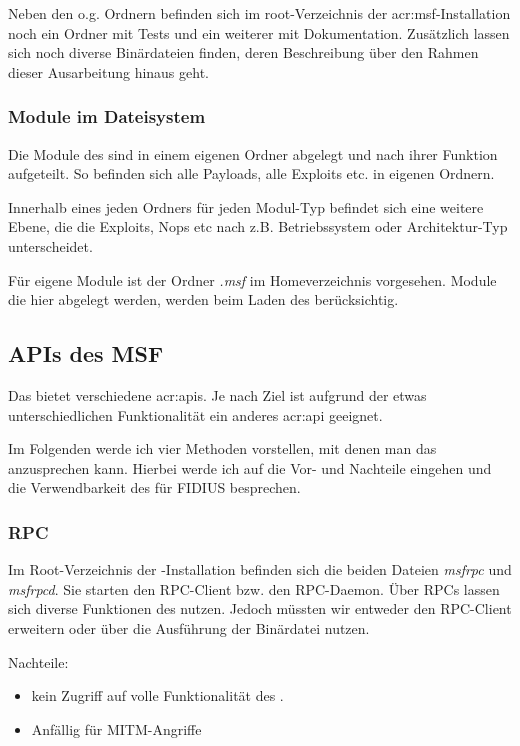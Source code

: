 Neben den o.g. Ordnern befinden sich im root-Verzeichnis der
\gls{acr:msf}-Installation noch ein Ordner mit Tests und ein weiterer
mit Dokumentation. Zusätzlich lassen sich noch diverse Binärdateien
finden, deren Beschreibung über den Rahmen dieser Ausarbeitung hinaus
geht. 

\subsubsection{Module im Dateisystem}

Die Module des  sind in einem eigenen Ordner abgelegt und
nach ihrer Funktion aufgeteilt. So befinden sich alle Payloads, alle
Exploits etc. in eigenen Ordnern. 

Innerhalb eines jeden Ordners für jeden Modul-Typ befindet sich eine
weitere Ebene, die die Exploits, Nops etc nach z.B. Betriebssystem
oder Architektur-Typ unterscheidet.

Für eigene Module ist der Ordner \emph{.msf} im Homeverzeichnis
vorgesehen. Module die hier abgelegt werden, werden beim Laden des
 berücksichtig. 

\subsection{APIs des MSF}

Das  bietet verschiedene \glspl{acr:api}. Je nach Ziel ist
aufgrund der etwas unterschiedlichen Funktionalität ein anderes
\gls{acr:api} geeignet.

Im Folgenden werde ich vier Methoden vorstellen, mit denen man das 
anzusprechen kann. Hierbei werde ich auf die Vor- und Nachteile
eingehen und die Verwendbarkeit des  für FIDIUS besprechen.

\subsubsection{RPC}

Im Root-Verzeichnis der -Installation befinden sich die
beiden Dateien \emph{msfrpc} und \emph{msfrpcd}. Sie starten den
RPC-Client bzw. den RPC-Daemon. 
Über RPCs lassen sich diverse Funktionen des  nutzen. 
Jedoch müssten wir entweder den RPC-Client erweitern oder über die
Ausführung der Binärdatei nutzen. 

Nachteile:
\begin{itemize}
  \item kein Zugriff auf volle Funktionalität des . 
  \item Anfällig für MITM-Angriffe
\end{itemize}

